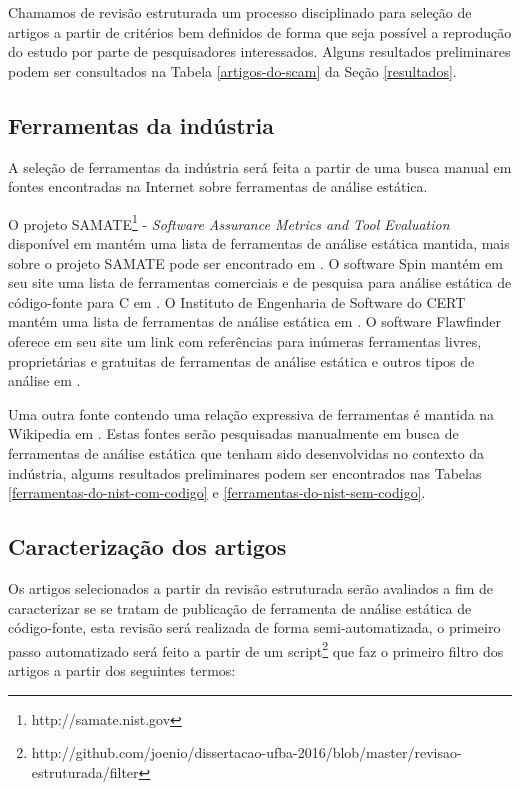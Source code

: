 \documentclass[qual, classic, a4paper]{ufbathesis}
\begin{document}
Chamamos de revisão estruturada um processo disciplinado para seleção de
artigos a partir de critérios bem definidos de forma que seja possível a
reprodução do estudo por parte de pesquisadores interessados. Alguns
resultados preliminares podem ser consultados na Tabela \ref{artigos-do-scam}
da Seção \ref{resultados}.

\subsection{Ferramentas da indústria}

A seleção de ferramentas da indústria será feita a partir de uma busca manual
em fontes encontradas na Internet sobre ferramentas de análise estática.

O projeto SAMATE\footnote{ http://samate.nist.gov} - {\em Software Assurance
Metrics and Tool Evaluation} disponível em  mantém
uma lista de ferramentas de análise estática mantida, mais sobre o projeto
SAMATE pode ser encontrado em . O software Spin
mantém em seu site uma lista de ferramentas comerciais e de pesquisa para
análise estática de código-fonte para C em
. O Instituto de Engenharia de Software
do CERT mantém uma lista de ferramentas de análise estática em
. O software Flawfinder oferece em seu site
um link com referências para inúmeras ferramentas livres, proprietárias e
gratuitas de ferramentas de análise estática e outros tipos de análise em
.

Uma outra fonte contendo uma relação expressiva de ferramentas é mantida na
Wikipedia em . Estas fontes serão
pesquisadas manualmente em busca de ferramentas de análise estática que tenham
sido desenvolvidas no contexto da indústria, algums resultados preliminares
podem ser encontrados nas Tabelas \ref{ferramentas-do-nist-com-codigo} e
\ref{ferramentas-do-nist-sem-codigo}.

\subsection{Caracterização dos artigos}

Os artigos selecionados a partir da revisão estruturada serão avaliados a fim
de caracterizar se se tratam de publicação de ferramenta de análise estática
de código-fonte, esta revisão será realizada de forma semi-automatizada, o
primeiro passo automatizado será feito a partir de um
script\footnote{http://github.com/joenio/dissertacao-ufba-2016/blob/master/revisao-estruturada/filter}
que faz o primeiro filtro dos artigos a partir dos seguintes termos:
\end{document}
